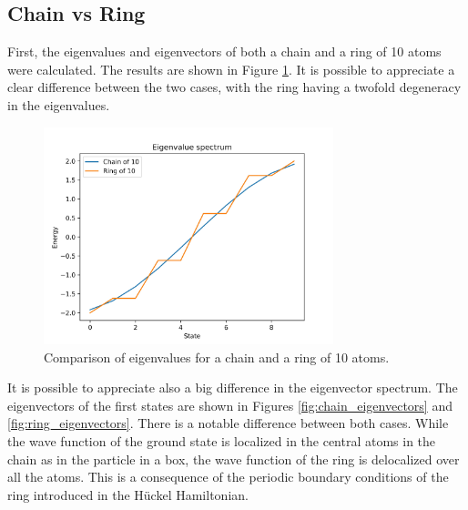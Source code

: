 \documentclass{article}
\begin{document}
\subsection{Chain vs Ring}
First, the eigenvalues and eigenvectors of both a chain and a ring of 10 atoms were calculated. The results are shown in Figure \ref{fig:chain_ring}. It is possible to appreciate a clear difference between the two cases, with the ring having a twofold degeneracy in the eigenvalues.

\begin{figure}[h]
    \centering
    \includegraphics[width=0.75\textwidth]{Figures/chain_vs_ring.jpg}
    \caption{Comparison of eigenvalues for a chain and a ring of 10 atoms.}
    \label{fig:chain_ring}
\end{figure}

It is possible to appreciate also a big difference in the eigenvector spectrum. The eigenvectors of the first states are shown in Figures \ref{fig:chain_eigenvectors} and \ref{fig:ring_eigenvectors}. There is a notable difference between both cases. While the wave function of the ground state is localized in the central atoms in the chain as in the particle in a box, the wave function of the ring is delocalized over all the atoms. This is a consequence of the periodic boundary conditions of the ring introduced in the Hückel Hamiltonian.
\end{document}
